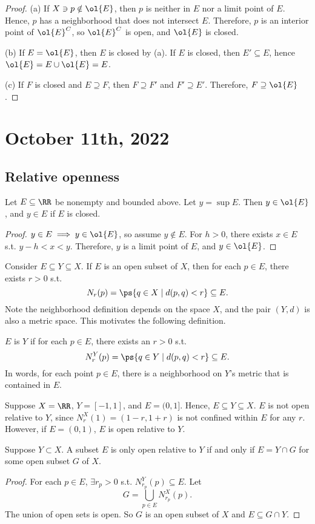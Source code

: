 \documentclass[11pt]{scrartcl}
\numberwithin{equation}{section}
\begin{document}
\begin{proof}
    (a) If $X\ni p\notin \ol{E}$, then $p$ is neither in $E$ nor a limit 
    point of $E$. Hence, $p$ has a neighborhood that does not 
    intersect $E$. Therefore, $p$ is an interior point of $\ol{E}^C$, so
    $\ol{E}^C$ is open, and $\ol{E}$ is closed.

    (b) If $E = \ol{E}$, then $E$ is closed by (a). If $E$ is closed,
    then $E'\subseteq E$, hence $\ol{E} = E\cup \ol{E} = E$.

    (c) If $F$ is closed and $E \supseteq F$, then $F\supseteq F'$
    and $F'\supseteq E'$. Therefore, $F\supseteq \ol{E}$.
\end{proof}

\clearpage
\section{October 11th, 2022}
\subsection{Relative openness}
\begin{proposition}
    Let $E\subseteq \RR$ be nonempty and bounded above.
    Let $y=\sup E$. Then $y\in \ol{E}$, and $y \in E$ if $E$ 
    is closed.
\end{proposition}
\begin{proof}
    $y\in E\implies y\in\ol{E}$, so assume $y\notin E$. For $h>0$,
    there exists $x\in E$ s.t. $y-h<x<y$. Therefore, $y$ is 
    a limit point of $E$, and $y\in\ol{E}$.
\end{proof}
Consider $E\subseteq Y \subseteq X$. If $E$ is an open subset of $X$, then 
for each $p\in E$, there exists $r>0$ s.t. 
\[N_r(p) = \ps{q\in X\mid d(p,q)<r}\subseteq E.\]
Note the neighborhood definition depends on the space $X$, and the pair 
$(Y,d)$ is also a metric space. This motivates the following definition.
\begin{definition}
    $E$ is  $Y$ if for each $p\in E$, there 
    exists an $r>0$ s.t.
    \[ N_r^Y(p) =\ps{q\in Y\mid d(p,q)<r}\subseteq E.\]
    In words, for each point $p\in E$, there is a neighborhood 
    on $Y$'s metric that is contained in $E$.
\end{definition}
\begin{example}
    Suppose $X=\RR$, $Y=[-1,1]$, and $E=(0,1]$. Hence, $E\subseteq Y\subseteq X$. $E$ is not open relative to $Y$, since $N_{r}^X(1)=(1-r,1+r)$
    is not confined within $E$ for any $r$.
    However, if $E=(0,1)$, $E$ is open relative to $Y$.
\end{example}
\begin{theorem}
    Suppose $Y\subset X$. A subset $E$ is only open relative to $Y$ if 
    and only if $E=Y\cap G$ for some open subset $G$ of $X$. 
\end{theorem}
\begin{proof}
    For each $p\in E$, $\exists r_p>0$ s.t. $N_{r_p}^Y(p) \subseteq E$.
    Let 
    \[ G=\bigcup_{p\in E}N_{r_p}^X(p).\] 
    The union of open sets is open. So $G$ is an open subset of $X$
    and $E\subseteq G\cap Y$. 
\end{proof}
\end{document}
